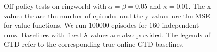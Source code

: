 \documentclass{article}
\begin{document}
\begin{figure}
\centering
\begin{adjustwidth}{-1.2in}{-1.2in}
\vspace{-3cm}
\hfill
{}
\hfill
{}
\end{adjustwidth}
\caption{\small Off-policy tests on ringworld with $\alpha = \beta = 0.05$ and $\kappa = 0.01$. The x-values the are the number of episodes and the y-values are the MSE for value functions. We run $100000$ episodes for $160$ independent runs. Baselines with fixed $\lambda$ values are also provided. The legends of GTD refer to the corresponding true online GTD baselines.}
\label{fig:ringworld_off}
\end{figure}
\end{document}

